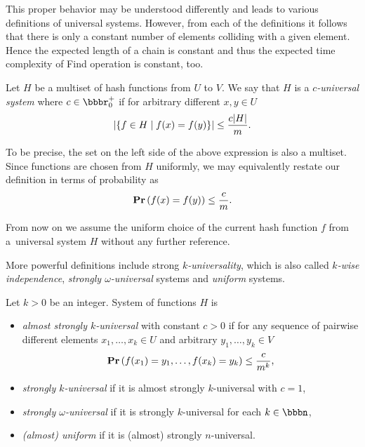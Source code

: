 This proper behavior may be understood differently and leads to various definitions of universal systems. However, from each of the definitions it follows that there is only a constant number of elements colliding with a given element. Hence the expected length of a chain is constant and thus the expected time complexity of Find operation is constant, too.

\begin{definition}
\label{definition-c-universal-system}
Let $H$ be a multiset of hash functions from $U$ to $V$. We say that $H$ is a \emph{$c$-universal system} where $c \in \bbbr_0^+$ if for arbitrary different $x, y \in U$
\[
\left|\lbrace f \in H \mid f(x) = f(y) \rbrace\right| \leq \frac{c|H|}{m}.
\]
\end{definition}

To be precise, the set on the left side of the above expression is also a multiset. Since functions are chosen from $H$ uniformly, we may equivalently restate our definition in terms of probability as
\[
\mathbf{Pr}\left(f(x) = f(y)\right) \leq \frac{c}{m}.
\]

From now on we assume the uniform choice of the current hash function $f$ from a~universal system $H$ without any further reference.

More powerful definitions include strong \emph{$k$-universality}, which is also called \emph{$k$-wise independence}, \emph{strongly $\omega$-universal} systems and \emph{uniform} systems.
\begin{definition}
Let $k > 0$ be an integer. System of functions $H$ is
\begin{itemize}
	\item \emph{almost strongly $k$-universal} with constant $c > 0$ if for any sequence of pairwise different elements $x_1, \dots, x_k \in U$ and arbitrary $y_1, \dots, y_k \in V$ \[\mathbf{Pr}\left(f(x_1) = y_1, \dots, f(x_k) = y_k\right) \leq \frac{c}{m^k}\mbox{,}\]
	\item \emph{strongly $k$-universal} \cite{DBLP:conf/focs/WegmanC79} if it is almost strongly $k$-universal with $c = 1$,
	\item \emph{strongly $\omega$-universal} \cite{DBLP:conf/focs/WegmanC79} if it is strongly $k$-universal for each $k \in \bbbn$,
	\item \emph{(almost) uniform} \cite{DBLP:journals/siamcomp/PaghP08} if it is (almost) strongly $n$-universal.
\end{itemize}
\end{definition}

